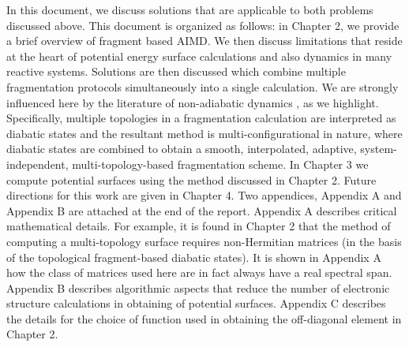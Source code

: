 In this document, we discuss solutions that are applicable to both problems
discussed above. This document is organized as follows: in Chapter 2, we provide
a brief overview of fragment based AIMD. We then discuss limitations that reside
at the heart of potential energy surface calculations and also dynamics in many
reactive systems. Solutions are then discussed which combine multiple fragmentation
protocols simultaneously into a single calculation. We are strongly influenced here
by the literature of non-adiabatic dynamics \cite{allen2012computer}, as we highlight.
Specifically, multiple topologies in a fragmentation calculation are interpreted as diabatic
states and the resultant method is multi-configurational in nature, where
diabatic states are combined to obtain a smooth, interpolated, adaptive,
system-independent, multi-topology-based fragmentation scheme. In Chapter 3 we
compute potential surfaces using the method discussed in Chapter 2. Future directions
for this work are given in Chapter 4. Two appendices, Appendix A and
Appendix B are attached at the end of the report. Appendix A describes
critical mathematical details. For example, it is found in Chapter 2 that the
method of computing a multi-topology surface requires non-Hermitian matrices
(in the basis of the topological fragment-based diabatic states).
It is shown in Appendix A how the class of matrices used here are in fact
always have a real spectral span. Appendix B describes algorithmic aspects that
reduce the number of electronic structure calculations in obtaining of potential surfaces.
Appendix C describes the details for the choice of function used in obtaining the
off-diagonal element in Chapter 2.
\newpage



